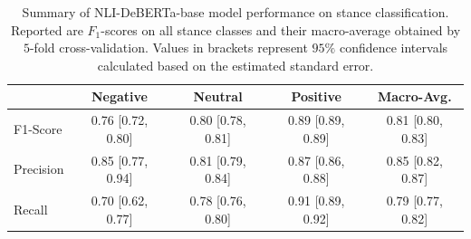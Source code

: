 \begin{table}[htbp]
\centering
\begin{tabular}{lcccc}
\toprule
 & Negative & Neutral & Positive & Macro-Avg. \\
\midrule
F1-Score & 0.76 [0.72, 0.80] & 0.80 [0.78, 0.81] & 0.89 [0.89, 0.89] & 0.81 [0.80, 0.83] \\
Precision & 0.85 [0.77, 0.94] & 0.81 [0.79, 0.84] & 0.87 [0.86, 0.88] & 0.85 [0.82, 0.87] \\
Recall & 0.70 [0.62, 0.77] & 0.78 [0.76, 0.80] & 0.91 [0.89, 0.92] & 0.79 [0.77, 0.82]  \\
\bottomrule
\end{tabular}
\caption[Performance evaluation of best model for stance classification]{Summary of NLI-DeBERTa-base model performance on stance classification. Reported are $F_1$-scores on all stance classes and their macro-average obtained by $5$-fold cross-validation. Values in brackets represent $95\%$ confidence intervals calculated based on the estimated standard error.}
\label{tab:detailed_results_stance_classification}
\end{table}